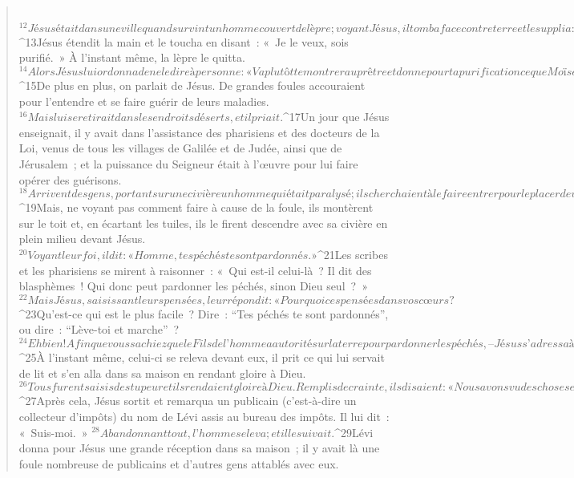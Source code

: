 \begin{verse}
         
${}^{12}Jésus était dans une ville quand survint un homme couvert de lèpre ; voyant Jésus, il tomba face contre terre et le supplia : « Seigneur, si tu le veux, tu peux me purifier. » 
${}^{13}Jésus étendit la main et le toucha en disant : « Je le veux, sois purifié. » À l’instant même, la lèpre le quitta. 
${}^{14}Alors Jésus lui ordonna de ne le dire à personne : « Va plutôt te montrer au prêtre et donne pour ta purification ce que Moïse a prescrit ; ce sera pour tous un témoignage. » 
${}^{15}De plus en plus, on parlait de Jésus. De grandes foules accouraient pour l’entendre et se faire guérir de leurs maladies. 
${}^{16}Mais lui se retirait dans les endroits déserts, et il priait.
${}^{17}Un jour que Jésus enseignait, il y avait dans l’assistance des pharisiens et des docteurs de la Loi, venus de tous les villages de Galilée et de Judée, ainsi que de Jérusalem ; et la puissance du Seigneur était à l’œuvre pour lui faire opérer des guérisons. 
${}^{18}Arrivent des gens, portant sur une civière un homme qui était paralysé ; ils cherchaient à le faire entrer pour le placer devant Jésus. 
${}^{19}Mais, ne voyant pas comment faire à cause de la foule, ils montèrent sur le toit et, en écartant les tuiles, ils le firent descendre avec sa civière en plein milieu devant Jésus. 
${}^{20}Voyant leur foi, il dit : « Homme, tes péchés te sont pardonnés. » 
${}^{21}Les scribes et les pharisiens se mirent à raisonner : « Qui est-il celui-là ? Il dit des blasphèmes ! Qui donc peut pardonner les péchés, sinon Dieu seul ? » 
${}^{22}Mais Jésus, saisissant leurs pensées, leur répondit : « Pourquoi ces pensées dans vos cœurs ? 
${}^{23}Qu’est-ce qui est le plus facile ? Dire : “Tes péchés te sont pardonnés”, ou dire : “Lève-toi et marche” ? 
${}^{24}Eh bien ! Afin que vous sachiez que le Fils de l’homme a autorité sur la terre pour pardonner les péchés, – Jésus s’adressa à celui qui était paralysé – je te le dis, lève-toi, prends ta civière et retourne dans ta maison. » 
${}^{25}À l’instant même, celui-ci se releva devant eux, il prit ce qui lui servait de lit et s’en alla dans sa maison en rendant gloire à Dieu. 
${}^{26}Tous furent saisis de stupeur et ils rendaient gloire à Dieu. Remplis de crainte, ils disaient : « Nous avons vu des choses extraordinaires aujourd’hui ! »
${}^{27}Après cela, Jésus sortit et remarqua un publicain (c’est-à-dire un collecteur d’impôts) du nom de Lévi assis au bureau des impôts. Il lui dit : « Suis-moi. » 
${}^{28}Abandonnant tout, l’homme se leva ; et il le suivait. 
${}^{29}Lévi donna pour Jésus une grande réception dans sa maison ; il y avait là une foule nombreuse de publicains et d’autres gens attablés avec eux. 

\end{verse}
